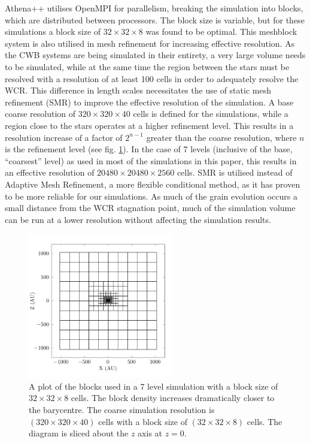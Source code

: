 \documentclass[fleqn,usenatbib]{mnras}
\begin{document}
Athena++ utilises OpenMPI for parallelism, breaking the simulation into blocks, which are distributed between processors.
The block size is variable, but for these simulations a block size of $32\times 32 \times 8$ was found to be optimal.
This meshblock system is also utilised in mesh refinement for increasing effective resolution.
As the CWB systems are being simulated in their entirety, a very large volume needs to be simulated, while at the same time the region between the stars must be resolved with a resolution of at least 100 cells in order to adequately resolve the WCR.
This difference in length scales necessitates the use of static mesh refinement (SMR) to improve the effective resolution of the simulation.
A base coarse resolution of $320 \times 320 \times 40$ cells is defined for the simulations, while a region close to the stars operates at a higher refinement level.
This results in a resolution increase of a factor of $2^{n-1}$ greater than the coarse resolution, where $n$ is the refinement level (see fig. \ref{fig:smr-grid}).
In the case of 7 levels (inclusive of the base, ``coarsest'' level) as used in most of the simulations in this paper, this results in an effective resolution of $20480 \times 20480 \times 2560$ cells.
SMR is utilised instead of Adaptive Mesh Refinement, a more flexible conditional method, as it has proven to be more reliable for our simulations.
As much of the grain evolution occurs a small distance from the WCR stagnation point, much of the simulation volume can be run at a lower resolution without affecting the simulation results.

\begin{figure}
  \centering
  \includegraphics[width=2.5in]{assets/mesh/gridxy.pdf}
  \caption[Static mesh refinement example]{A plot of the blocks used in a 7 level simulation with a block size of $32\times 32 \times 8$ cells. The block density increases dramatically closer to the barycentre. The coarse simulation resolution is $(320\times 320\times 40)$ cells with a block size of $(32\times32\times8)$ cells. The diagram is sliced about the $z$ axis at $z=0$.}
  \label{fig:smr-grid}
\end{figure}
\end{document}
